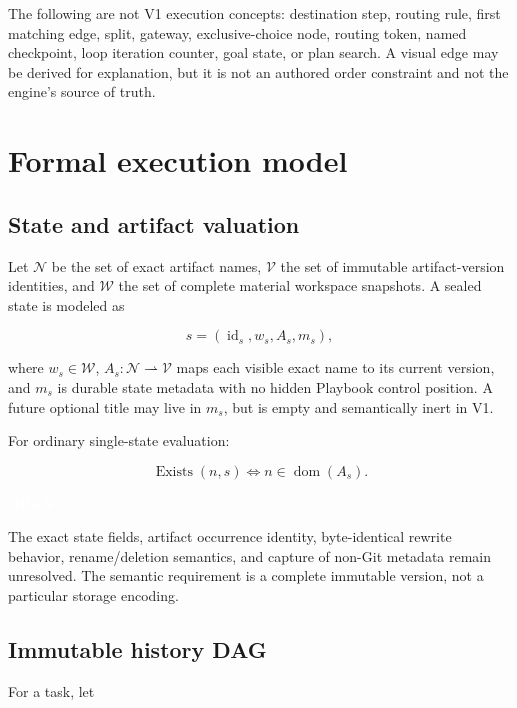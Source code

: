 \documentclass[11pt]{article}
\newcommand{\statuspill}[2]{%
  \begingroup\setlength{\fboxsep}{3pt}%
  \colorbox{#1}{\textcolor{white}{\sffamily\bfseries\scriptsize #2}}%
  \endgroup}
\newcommand{\Open}{\statuspill{Amber}{OPEN}}
\begin{document}
The following are not V1 execution concepts: destination step, routing rule, first matching edge, split, gateway, exclusive-choice node, routing token, named checkpoint, loop iteration counter, goal state, or plan search. A visual edge may be derived for explanation, but it is not an authored order constraint and not the engine's source of truth.

\section{Formal execution model}

\subsection{State and artifact valuation}

Let \(\mathcal{N}\) be the set of exact artifact names, \(\mathcal{V}\) the set of immutable artifact-version identities, and \(\mathcal{W}\) the set of complete material workspace snapshots. A sealed state is modeled as

\begin{equation}
  s = (\operatorname{id}_s, w_s, A_s, m_s),
\end{equation}

where \(w_s \in \mathcal{W}\), \(A_s : \mathcal{N} \rightharpoonup \mathcal{V}\) maps each visible exact name to its current version, and \(m_s\) is durable state metadata with no hidden Playbook control position. A future optional title may live in \(m_s\), but is empty and semantically inert in V1.

For ordinary single-state evaluation:

\begin{equation}
  \operatorname{Exists}(n,s) \iff n \in \operatorname{dom}(A_s).
\end{equation}

\Open

The exact state fields, artifact occurrence identity, byte-identical rewrite behavior, rename/deletion semantics, and capture of non-Git metadata remain unresolved. The semantic requirement is a complete immutable version, not a particular storage encoding.

\subsection{Immutable history DAG}

For a task, let
\end{document}

